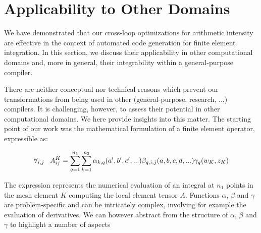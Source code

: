 \section{Applicability to Other Domains}
\label{sec:generality}
We have demonstrated that our cross-loop optimizations for arithmetic intensity are effective in the context of automated code generation for finite element integration. In this section, we discuss their applicability in other computational domains and, more in general, their integrability within a general-purpose compiler.

There are neither conceptual nor technical reasons which prevent our transformations from being used in other (general-purpose, research, ...) compilers. It is challenging, however, to assess their potential in other computational domains. We here provide insights into this matter. The starting point of our work was the mathematical formulation of a finite element operator, expressible as:

\begin{equation}
\label{eq:assembly-model}
\scriptsize
\forall_{i, j} ~~~ A_{ij}^K = \sum_{q=1}^{n_1} \sum_{k=1}^{n_2} \alpha_{k, q}(a', b', c', ...) \beta_{q, i, j}(a, b, c, d, ...) \gamma_{q}(w_K, z_K)
\end{equation}

The expression represents the numerical evaluation of an integral at $n_1$ points in the mesh element $K$ computing the local element tensor $A$. Functions $\alpha$, $\beta$ and $\gamma$ are problem-specific and can be intricately complex, involving for example the evaluation of derivatives. We can however abstract from the structure of $\alpha$, $\beta$ and $\gamma$ to highlight a number of aspects


